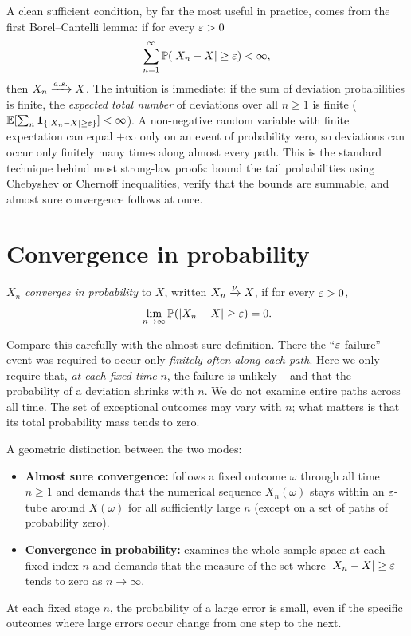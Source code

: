 \begin{formalbox}
A clean sufficient condition, by far the most useful in practice, comes from the
first Borel--Cantelli lemma: if for every $\varepsilon>0$
\[
  \sum_{n=1}^{\infty} \operatorname{\mathbb{P}}\!\left(\lvert X_n - X\rvert \ge \varepsilon\right) < \infty,
\]
then $X_n \xrightarrow{a.s.} X$. The intuition is immediate: if the sum of deviation probabilities
is finite, the \emph{expected total number} of deviations over all $n \ge 1$ is
finite ($\operatorname{\mathbb{E}}[\sum_n \mathbf{1}_{\{\lvert X_n-X\rvert\ge\varepsilon\}}] < \infty$). A non-negative random
variable with finite expectation can equal $+\infty$ only on an event of probability zero,
so deviations can occur only finitely many times along
almost every path. This is the standard technique behind most strong-law proofs:
bound the tail probabilities using Chebyshev or Chernoff inequalities, verify that
the bounds are summable, and almost sure convergence follows at once.
\end{formalbox}

\section{Convergence in probability}
\label{ch22:prob}

\begin{definition}
\label{ch22:def-prob}
$X_n$ \emph{converges in probability} to $X$, written $X_n \xrightarrow{p} X$, if for every
$\varepsilon > 0$,
\[
  \lim_{n\to\infty} \operatorname{\mathbb{P}}\!\left(\lvert X_n - X\rvert \ge \varepsilon\right) = 0.
\]
\end{definition}

Compare this carefully with the almost-sure definition. There the ``$\varepsilon$-failure'' event was
required to occur only \emph{finitely often along each path}. Here we only require
that, \emph{at each fixed time} $n$, the failure is unlikely -- and that the
probability of a deviation shrinks with $n$. We do not examine entire paths across all time.
The set of exceptional outcomes may vary with $n$; what matters is that its total probability mass tends to zero.

\begin{intuitionbox}
A geometric distinction between the two modes:
\begin{itemize}
\item \textbf{Almost sure convergence:} follows a fixed outcome $\omega$ through all time $n \ge 1$
and demands that the numerical sequence $X_n(\omega)$ stays within an $\varepsilon$-tube around $X(\omega)$ for all sufficiently large $n$ (except on a set of paths of probability zero).
\item \textbf{Convergence in probability:} examines the whole sample space at each fixed index $n$
and demands that the measure of the set where $\lvert X_n - X\rvert \ge \varepsilon$ tends to zero as $n \to \infty$.
\end{itemize}
At each fixed stage $n$, the probability of a large error is small, even if the specific outcomes where large errors occur change from one step to the next.
\end{intuitionbox}

